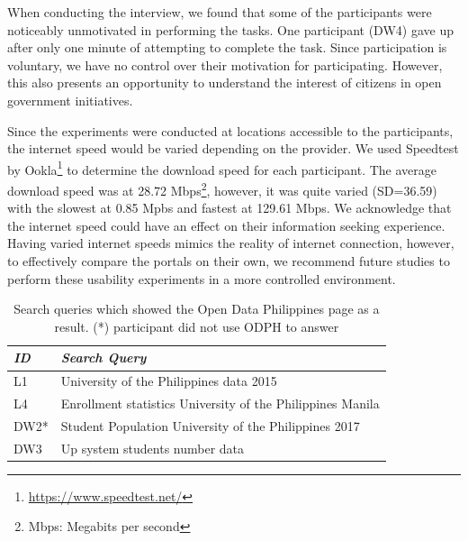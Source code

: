 \documentclass{sigchi}
\begin{document}
When conducting the interview, we found that some of the participants were noticeably unmotivated in performing the tasks. One participant (DW4) gave up after only one minute of attempting to complete the task. Since participation is voluntary, we have no control over their motivation for participating. However, this also presents an opportunity to understand the interest of citizens in open government initiatives.


Since the experiments were conducted at locations accessible to the participants, the internet speed would be varied depending on the provider. We used Speedtest by Ookla\footnote{\url{https://www.speedtest.net/}} to determine the download speed for each participant. The average download speed was at 28.72 Mbps\footnote{Mbps: Megabits per second}, however, it was quite varied (SD=36.59) with the slowest at 0.85 Mpbs and fastest at 129.61 Mbps. We acknowledge that the internet speed could have an effect on their information seeking experience. Having varied internet speeds mimics the reality of internet connection, however, to effectively compare the portals on their own, we recommend future studies to perform these usability experiments in a more controlled environment.

\begin{table}[t]
  \centering
  \begin{tabular}{l p{6.75cm}}
    \toprule
     \textit{ID} & \textit{Search Query} \\
     \midrule
     L1 & University of the Philippines data 2015 \\
     L4 & Enrollment statistics University of the Philippines Manila \\
     DW2* & Student Population University of the Philippines 2017 \\
     DW3 & Up system students number data \\
     \bottomrule
  \end{tabular}
  \caption{Search queries which showed the Open Data Philippines page as a result. (*) participant did not use ODPH to answer}
  \label{tab:ODPHqueries}
\end{table}
\end{document}
